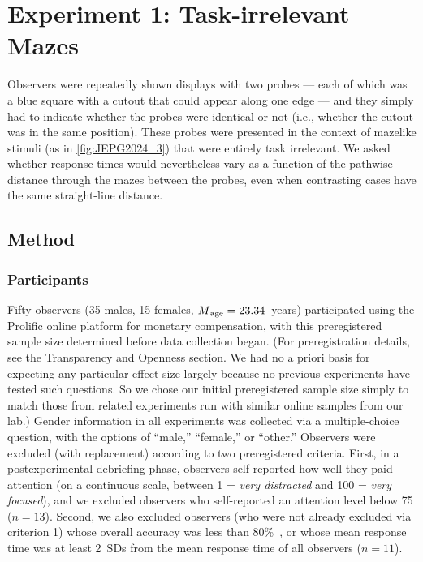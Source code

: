\section{Experiment 1: Task-irrelevant Mazes}
Observers were repeatedly shown displays with two probes --- each of which was a blue square with a cutout that could appear along one edge --- and they simply had to indicate whether the probes were identical or not (i.e., whether the cutout was in the same position). These probes were presented in the context of mazelike stimuli (as in \cref{fig:JEPG2024_3}) that were entirely task irrelevant. We asked whether response times would nevertheless vary as a function of the pathwise distance through the mazes between the probes, even when contrasting cases have the same straight-line distance.

\subsection{Method}

\subsubsection{Participants}
Fifty observers (35 males, 15 females, $M\textsubscript{age} = 23.34$~years) participated using the Prolific online platform \parencite{palan_prolificacsubject_2018} for monetary compensation, with this preregistered sample size determined before data collection began. (For preregistration details, see the Transparency and Openness section. We had no a priori basis for expecting any particular effect size largely because no previous experiments have tested such questions. So we chose our initial preregistered sample size simply to match those from related experiments run with similar online samples from our lab.) Gender information in all experiments was collected via a multiple-choice question, with the options of “male,” “female,” or “other.” Observers were excluded (with replacement) according to two preregistered criteria. First, in a postexperimental debriefing phase, observers self-reported how well they paid attention (on a continuous scale, between 1 = \textit{very distracted} and 100 = \textit{very focused}), and we excluded observers who self-reported an attention level below 75 ($n = 13$). Second, we also excluded observers (who were not already excluded via criterion 1) whose overall accuracy was less than 80\%~, or whose mean response time was at least \qty{2}{SD}s from the mean response time of all observers ($n = 11$).

